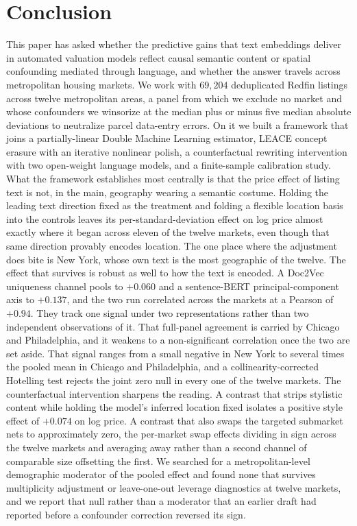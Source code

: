 
\section{Conclusion}
\label{sec:conclusion}

This paper has asked whether the predictive gains that text embeddings deliver in
automated valuation models reflect causal semantic content or spatial confounding
mediated through language, and whether the answer travels across metropolitan
housing markets. We work with $69{,}204$ deduplicated Redfin listings across twelve
metropolitan areas, a panel from which we exclude no market and whose
confounders we winsorize at the median plus or minus five median absolute
deviations to neutralize parcel data-entry errors. On it we built a framework that
joins a partially-linear Double Machine Learning estimator, LEACE concept erasure
with an iterative nonlinear polish, a counterfactual rewriting intervention with
two open-weight language models, and a finite-sample calibration study. What
the framework establishes most centrally is that the price effect of listing text
is not, in the main, geography wearing a semantic costume. Holding the
leading text direction fixed as the treatment and folding a flexible location
basis into the controls leaves its per-standard-deviation effect on log price
almost exactly where it began across eleven of the twelve markets, even though
that same direction provably encodes location. The one place where the
adjustment does bite is New York, whose own text is the most geographic of the
twelve. The effect that survives is robust as well to how the text is encoded.
A Doc2Vec uniqueness channel pools to $+0.060$ and a sentence-BERT
principal-component axis to $+0.137$, and the two run correlated across the
markets at a Pearson of $+0.94$. They track one signal under two representations
rather than two independent observations of it. That full-panel agreement is
carried by Chicago and Philadelphia, and it weakens to a non-significant
correlation once the two are set aside. That signal ranges from a small negative
in New York to several times the pooled mean in Chicago and Philadelphia, and a
collinearity-corrected Hotelling test rejects the joint zero null in every one of
the twelve markets. The counterfactual intervention sharpens the reading. A
contrast that strips stylistic content while holding the model's inferred location
fixed isolates a positive style effect of $+0.074$ on log price. A contrast
that also swaps the targeted submarket nets to approximately zero, the per-market
swap effects dividing in sign across the twelve markets and averaging away rather
than a second channel of comparable size offsetting the first. We
searched for a metropolitan-level demographic moderator of the pooled effect and
found none that survives multiplicity adjustment or leave-one-out leverage
diagnostics at twelve markets, and we report that null rather than a moderator
that an earlier draft had reported before a confounder correction reversed its
sign.

